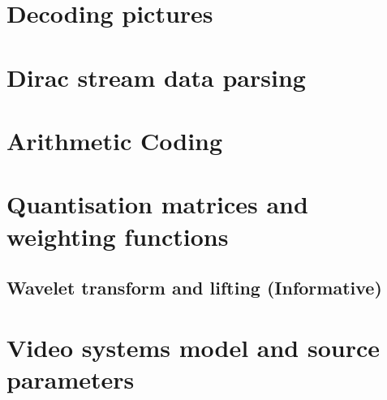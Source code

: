\clearpage
%
\section{Decoding pictures}






\appendix
\section{Dirac stream data parsing}

\clearpage
\section{Arithmetic Coding}

\clearpage
\section{Quantisation matrices and weighting functions}


\clearpage
\begin{informative*}
\section{Wavelet transform and lifting (Informative)}

\end{informative*}
\clearpage
\section{Video systems model and source parameters}


